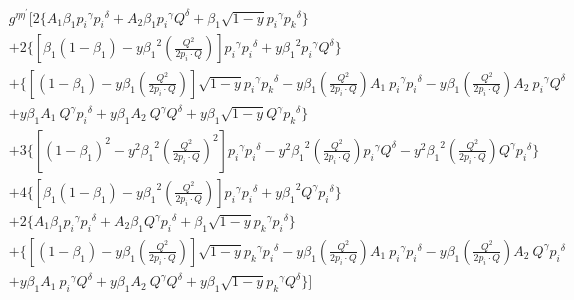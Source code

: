 \begin{equation}
\begin{split} 
& g^{{{\eta}}{{\eta}^{\prime}}}[2\lbrace A_1\beta_1 {p_i}^{{\gamma}}{{p_i}^{{\delta}}}+A_2\beta_1 {p_i}^{{\gamma}}{{Q}^{{\delta}}}+\beta_1 \sqrt{1-y}{p_i}^{{\gamma}}{{p_k}^{{\delta}}} \rbrace \\&
+2\lbrace [\beta_1(1-\beta_1)-y {\beta_1}^2 (\frac{Q^2}{2p_i \cdot Q})] {p_i}^{{\gamma}}{p_i}^{{\delta}}+y {\beta_1}^2 {p_i}^{{\gamma}}{Q}^{{\delta}} \rbrace\\
&+\lbrace [(1-\beta_1)-y\beta_1 (\frac{Q^2}{2p_i \cdot Q})] \sqrt{1-y}{p_i}^{{\gamma}}{{p_k}^{{\delta}}}-y {\beta_1} (\frac{Q^2}{2p_i \cdot Q}) A_1 \:{p_i}^{{\gamma}}{p_i}^{{\delta}}
-y {\beta_1} (\frac{Q^2}{2p_i \cdot Q}) A_2\: {p_i}^{{\gamma}}{Q}^{{\delta}}\\
&+y {\beta_1} A_1 \:{Q}^{{\gamma}}{p_i}^{{\delta}}+y {\beta_1} A_2 \:{Q}^{{\gamma}}{Q}^{{\delta}}+y {\beta_1}\sqrt{1-y}{Q}^{{\gamma}}{{p_k}^{{\delta}}} \rbrace \\
&+3\lbrace [(1-\beta_1)^2-y^2 {\beta_1}^2 (\frac{Q^2}{2p_i \cdot Q})^2] {p_i}^{{\gamma}}{p_i}^{{\delta}}-y^2 {\beta_1}^2 (\frac{Q^2}{2p_i \cdot Q}){p_i}^{{\gamma}}{Q}^{{\delta}}-y^2 {\beta_1}^2 (\frac{Q^2}{2p_i \cdot Q}){Q}^{{\gamma}}{p_i}^{{\delta}} \rbrace\\
&+4\lbrace [\beta_1(1-\beta_1)-y {\beta_1}^2 (\frac{Q^2}{2p_i \cdot Q})] {p_i}^{{\gamma}}{p_i}^{{\delta}}+y {\beta_1}^2 {Q}^{{\gamma}}{p_i}^{{\delta}} \rbrace\\
&+2\lbrace A_1\beta_1 {p_i}^{{\gamma}}{{p_i}^{{\delta}}}+A_2\beta_1 {Q}^{{\gamma}}{{p_i}^{{\delta}}}+\beta_1 \sqrt{1-y}{p_k}^{{\gamma}}{{p_i}^{{\delta}}} \rbrace \\
&+\lbrace [(1-\beta_1)-y\beta_1 (\frac{Q^2}{2p_i \cdot Q})] \sqrt{1-y}{p_k}^{{\gamma}}{{p_i}^{{\delta}}}-y {\beta_1} (\frac{Q^2}{2p_i \cdot Q}) A_1 \:{p_i}^{{\gamma}}{p_i}^{{\delta}}
-y {\beta_1} (\frac{Q^2}{2p_i \cdot Q}) A_2\: {Q}^{{\gamma}}{p_i}^{{\delta}}\\
&+y {\beta_1} A_1 \:{p_i}^{{\gamma}}{Q}^{{\delta}}+y {\beta_1} A_2 \:{Q}^{{\gamma}}{Q}^{{\delta}}+y {\beta_1}\sqrt{1-y}{p_k}^{{\gamma}}{{Q}^{{\delta}}} \rbrace]\\
\end{split}
\end{equation}

